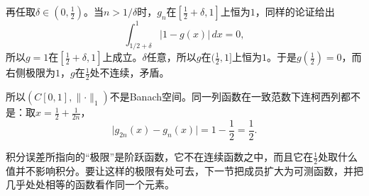 再任取$\delta\in(0,\tfrac12)$。当$n>1/\delta$时，$g_n$在$[\tfrac12+\delta,1]$上恒为$1$，同样的论证给出
\[
 \int_{1/2+\delta}^1\lvert1-g(x)\rvert\,dx=0,
\]
所以$g=1$在$[\tfrac12+\delta,1]$上成立。$\delta$任意，所以$g$在$(\tfrac12,1]$上恒为$1$。于是$g(\tfrac12)=0$，而右侧极限为$1$，$g$在$\tfrac12$处不连续，矛盾。

所以$(C[0,1],\lVert\cdot\rVert_1)$不是Banach空间。同一列函数在一致范数下连柯西列都不是：取$x=\tfrac12+\tfrac1{2n}$，
\[
 \lvert g_{2n}(x)-g_n(x)\rvert=1-\frac12=\frac12.
\]

积分误差所指向的“极限”是阶跃函数，它不在连续函数之中，而且它在$\tfrac12$处取什么值并不影响积分。要让这样的极限有处可去，下一节把成员扩大为可测函数，并把几乎处处相等的函数看作同一个元素。
